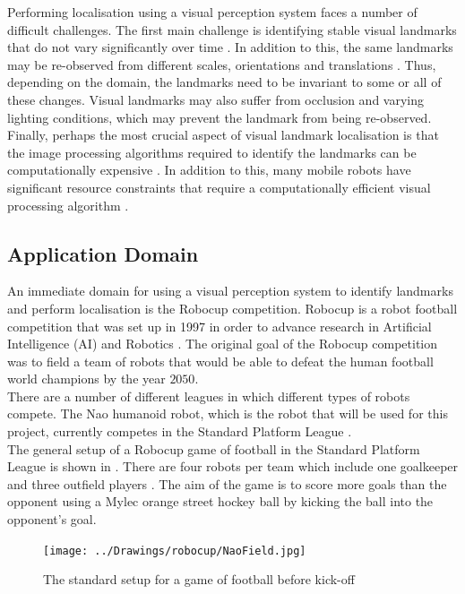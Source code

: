 Performing localisation using a visual perception system faces a number of difficult challenges. The first main challenge is identifying stable visual landmarks that do not vary significantly over time \citep{Davison2007, Se2002}. In addition to this, the same landmarks may be re-observed from different scales, orientations and translations \citep{Szeliski2010}. Thus, depending on the domain, the landmarks need to be invariant to some or all of these changes. Visual landmarks may also suffer from occlusion and varying lighting conditions, which may prevent the landmark from being re-observed. Finally, perhaps the most crucial aspect of visual landmark localisation is that the image processing algorithms required to identify the landmarks can be computationally expensive \citep{Juan2009}. In addition to this, many mobile robots have significant resource constraints that require a computationally efficient visual processing algorithm \citep{NaoHead}. \\

\subsection{Application Domain}
\label{sec:domain}
An immediate domain for using a visual perception system to identify landmarks and perform localisation is the Robocup competition. Robocup is a robot football competition that was set up in 1997 in order to advance research in Artificial Intelligence (AI) and Robotics \citep{Robocup}. The original goal of the Robocup competition was to field a team of robots that would be able to defeat the human football world champions by the year $2050$.\\

There are a number of different leagues in which different types of robots compete. The Nao humanoid robot, which is the robot that will be used for this project, currently competes in the Standard Platform League \citep{StandardPlatform}.\\

The general setup of a Robocup game of football in the Standard Platform League is shown in . There are four robots per team which include one goalkeeper and three outfield players \citep{Rules}. The aim of the game is to score more goals than the opponent using a Mylec orange street hockey ball by kicking the ball into the opponent's goal.\\

\begin{figure}[h!] 
  \centering
    \texttt{[image: ../Drawings/robocup/NaoField.jpg]}
    \caption{The standard setup for a game of football before kick-off \citep{Rules}}
    \label{fig:naofield}
\end{figure}

